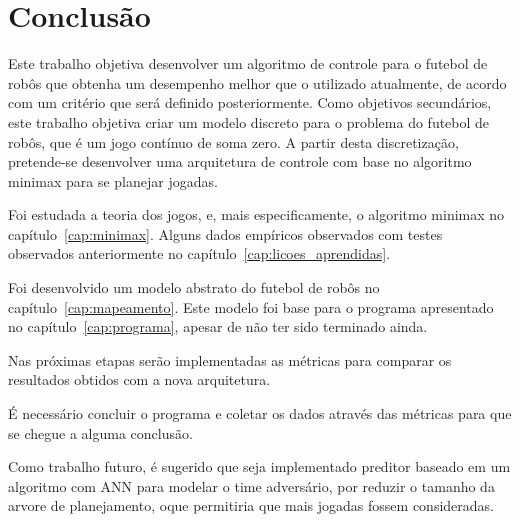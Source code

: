 \chapter{Conclusão}\label{cap:conclusao}

Este trabalho objetiva desenvolver um algoritmo de controle para o futebol
de robôs que obtenha um desempenho melhor que o utilizado atualmente, de acordo
com um critério que será definido posteriormente.
Como objetivos secundários, este trabalho objetiva criar um modelo discreto para
o problema do futebol de robôs, que é um jogo contínuo de soma zero.
A partir desta discretização, pretende-se desenvolver uma arquitetura de
controle com base no algoritmo minimax para se planejar jogadas.

Foi estudada a teoria dos jogos, e, mais especificamente, o algoritmo minimax
no capítulo~\ref{cap:minimax}. Alguns dados empíricos observados com testes
observados anteriormente no capítulo~\ref{cap:licoes_aprendidas}.

Foi desenvolvido um modelo abstrato do futebol de robôs no
capítulo~\ref{cap:mapeamento}. Este modelo foi base para o programa apresentado
no capítulo~\ref{cap:programa}, apesar de não ter sido terminado ainda.

Nas próximas etapas serão implementadas as métricas para comparar os resultados
obtidos com a nova arquitetura.

É necessário concluir o programa e coletar os dados através das métricas para
que se chegue a alguma conclusão.

Como trabalho futuro, é sugerido que seja implementado preditor baseado em
um algoritmo com ANN para modelar o time adversário, por reduzir o tamanho da
arvore de planejamento, oque permitiria que mais jogadas fossem consideradas.

